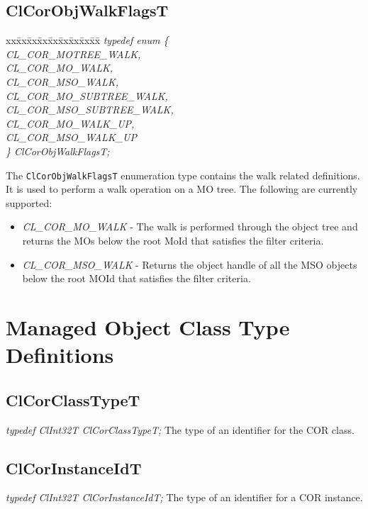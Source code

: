 \begin{flushleft}
\subsection{ClCorObjWalkFlagsT}
\begin{tabbing}
xx\=xx\=xx\=xx\=xx\=xx\=xx\=xx\=xx\=\kill
\textit{typedef enum \{}\\
\>\>\>\>\textit{CL\_COR\_MOTREE\_WALK,}\\
\>\>\>\>\textit{CL\_COR\_MO\_WALK,}\\
\>\>\>\>\textit{CL\_COR\_MSO\_WALK,}\\
\>\>\>\>\textit{CL\_COR\_MO\_SUBTREE\_WALK,}\\
\>\>\>\>\textit{CL\_COR\_MSO\_SUBTREE\_WALK,}\\
\>\>\>\>\textit{CL\_COR\_MO\_WALK\_UP,}\\
\>\>\>\>\textit{CL\_COR\_MSO\_WALK\_UP}\\
\textit{\} ClCorObjWalkFlagsT;}\end{tabbing}
 The {\tt{ClCorObjWalkFlagsT}} enumeration type contains the walk related definitions. It is used to perform a walk operation on a MO tree.
 The following are currently supported:
\begin{itemize}
\item
\textit{CL\_\-COR\_\-MO\_\-WALK} - The walk is performed through the object tree and returns the MOs below the root MoId that satisfies the filter
criteria.
\item
\textit{CL\_\-COR\_\-MSO\_\-WALK} - Returns the object handle of all the MSO objects below the root MOId that satisfies the filter criteria.
\end{itemize}


\section{Managed Object Class Type Definitions}
\subsection{ClCorClassTypeT}
\textit{typedef ClInt32T ClCorClassTypeT;}
\newline
\newline
The type of an identifier for the COR class.


\subsection{ClCorInstanceIdT}
\textit{typedef ClInt32T ClCorInstanceIdT;}
\newline
\newline
The type of an identifier for a COR instance.



\end{flushleft}
